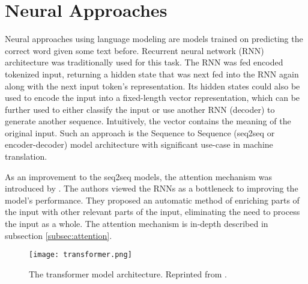 \section{Neural Approaches}
\label{sec:neural_approaches}

Neural approaches using language modeling are models trained on predicting the correct word given some text before.  %
Recurrent neural network (RNN) architecture was traditionally used for this task.
The RNN was fed encoded tokenized input, returning a hidden state that was next fed into the RNN again along with the next input token's representation.
Its hidden states could also be used to encode the input into a fixed-length vector representation, which can be further used to either classify the input or use another RNN (decoder) to generate another sequence.
Intuitively, the vector contains the meaning of the original input. 
Such an approach is the Sequence to Sequence (seq2seq or encoder-decoder) model architecture \citep{seq2seq} with significant use-case in machine translation.

As an improvement to the seq2seq models, the attention mechanism was introduced by \citet{first-attention}.
The authors viewed the RNNs as a bottleneck to improving the model's performance.
They proposed an automatic method of enriching parts of the input with other relevant parts of the input, eliminating the need to process the input as a whole.
The attention mechanism is in-depth described in subsection \ref{subsec:attention}.

\begin{figure}[b!]
        \centering
        \texttt{[image: transformer.png]}
        \caption[Transformer Model Architecture]{The transformer model architecture. Reprinted from \citep{attention-is-all-you-need}.}
        \label{fig:transformer}
\end{figure}

